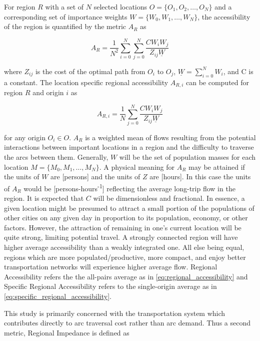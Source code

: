 \documentclass[11pt]{article}
\begin{document}
\begin{multicols}{2}
For region $R$ with a set of $N$ selected locations $O = \{O_1, O_2, \dots, O_N\}$ and a corresponding set of importance weights $W = \{W_0, W_1, \dots, W_N\}$, the accessibility of the region is quantified by the metric $A_{R}$ as

\begin{equation}
	A_{R} = \frac{1}{N^2}\sum_{i = 0}^{N} \sum_{j = 0 }^{N} \frac{CW_iW_j}{Z_{ij}\underline{W}} \label{eq:regional_accessibility}
\end{equation}

\noindent where $Z_{ij}$ is the cost of the optimal path from $O_i$ to $O_j$, $\underline{W} = \sum_{i = 0}^{N} W_i$, and C is a constant. The location specific regional accessibility $A_{R,i}$ can be computed for region $R$ and origin $i$ as

\begin{equation}
	A_{R,i} = \frac{1}{N}\sum_{j = 0 }^{N} \frac{CW_iW_j}{Z_{ij}\underline{W}} \label{eq:specific_regional_accessibility}
\end{equation}

for any origin $O_i \in O$. $A_{R}$ is a weighted mean of flows resulting from the potential interactions between important locations in a region and the difficulty to traverse the arcs between them. Generally, $W$ will be the set of population masses for each location $M = \{M_0, M_1, \dots, M_N\}$. A physical meaning for $A_R$ may be attained if the units of $W$ are [persons] and the units of $Z$ are [hours]. In this case the units of $A_R$ would be [persons-hours\textsuperscript{-1}] reflecting the average long-trip flow in the region. It is expected that $C$ will be dimensionless and fractional. In essence, a given location might be presumed to attract a small portion of the populations of other cities on any given day in proportion to its population, economy, or other factors. However, the attraction of remaining in one's current location will be quite strong, limiting potential travel. A strongly connected region will have higher average accessibility than a weakly integrated one. All else being equal, regions which are more populated/productive, more compact, and enjoy better transportation networks will experience higher average flow. Regional Accessibility refers the the all-pairs average as in \eqref{eq:regional_accessibility} and Specific Regional Accessibility refers to the single-origin average as in \eqref{eq:specific_regional_accessibility}.

This study is primarily concerned with the transportation system which contributes directly to arc traversal cost rather than arc demand. Thus a second metric, Regional Impedance is defined as


\end{multicols}
\end{document}
